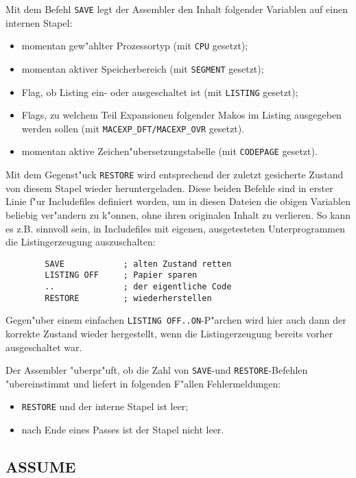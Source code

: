 \documentclass[12pt,a4paper,twoside]{report}
\makeatletter
\newcommand{\tty}[1]{{\tt #1}}
\newcommand{\ttindex}[1]{\index{#1@{\tt #1}}}
\makeatother
\begin{document}
Mit dem Befehl \tty{SAVE} legt der Assembler den Inhalt folgender
Variablen auf einen internen Stapel:
\begin{itemize}
\item{momentan gew"ahlter Prozessortyp (mit \tty{CPU} gesetzt);}
\item{momentan aktiver Speicherbereich (mit \tty{SEGMENT} gesetzt);}
\item{Flag, ob Listing ein- oder ausgeschaltet ist (mit \tty{LISTING}
      gesetzt);}
\item{Flags, zu welchem Teil Expansionen folgender Makos im Listing
      ausgegeben werden sollen (mit \tty{MACEXP\_DFT/MACEXP\_OVR}
      gesetzt).}
\item{momentan aktive Zeichen"ubersetzungstabelle (mit \tty{CODEPAGE}
      gesetzt).}
\end{itemize}
Mit dem Gegenst"uck \tty{RESTORE} wird entsprechend der zuletzt
gesicherte Zustand von diesem Stapel wieder heruntergeladen.  Diese beiden
Befehle sind in erster Linie f"ur Includefiles definiert worden, um
in diesen Dateien die obigen Variablen beliebig ver"andern zu k"onnen,
ohne ihren originalen Inhalt zu verlieren.  So kann es z.B. sinnvoll sein,
in Includefiles mit eigenen, ausgetesteten Unterprogrammen die
Listingerzeugung auszuschalten:
\begin{verbatim}
        SAVE            ; alten Zustand retten
        LISTING OFF     ; Papier sparen
        ..              ; der eigentliche Code
        RESTORE         ; wiederherstellen
\end{verbatim}
Gegen"uber einem einfachen \tty{LISTING OFF..ON}-P"archen wird hier
auch dann der korrekte Zustand wieder hergestellt, wenn die Listingerzeugung
bereits vorher ausgeschaltet war.
\par
Der Assembler "uberpr"uft, ob die Zahl von \tty{SAVE}-und \tty{RESTORE}-Befehlen
"ubereinstimmt und liefert in folgenden F"allen Fehlermeldungen:
\begin{itemize}
\item{\tty{RESTORE} und der interne Stapel ist leer;}
\item{nach Ende eines Passes ist der Stapel nicht leer.}
\end{itemize}


\subsection{ASSUME}
\ttindex{ASSUME}
\end{document}
